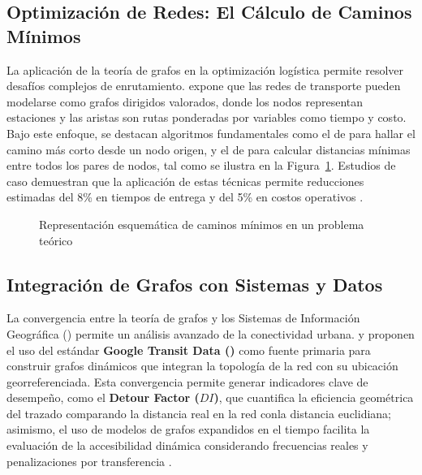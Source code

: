 \subsection{Optimización de Redes: El Cálculo de Caminos Mínimos}
\label{subsec:caminos-minimos}
    La aplicación de la teoría de grafos en la optimización logística permite resolver desafíos complejos de
    enrutamiento. \textcite{allauca2023} expone que las redes de transporte pueden modelarse como grafos dirigidos
    valorados, donde los nodos representan estaciones y las aristas son rutas ponderadas por variables como tiempo
    y costo. Bajo este enfoque, se destacan algoritmos fundamentales como el de \dijkstra{} para hallar el camino
    más corto desde un nodo origen, y el de \floyd{} para calcular distancias mínimas entre todos los pares de
    nodos, tal como se ilustra en la Figura~\ref{fig:CaminosMinimo}. Estudios de caso demuestran que la aplicación
    de estas técnicas permite reducciones estimadas del 8\% en tiempos de entrega y del 5\% en costos operativos
    \parencite{allauca2023}.

\begin{figure}[H]
    \centering
    \caption{Representación esquemática de caminos mínimos en un problema teórico}
    \label{fig:CaminosMinimo}
\end{figure}

\subsection{Integración de Grafos con Sistemas \gis{} y Datos \gtfs{}}
\label{subsec:grafos-sig-gtfs}
    La convergencia entre la teoría de grafos y los Sistemas de Información Geográfica (\gis{}) permite un
    análisis avanzado de la conectividad urbana. \textcite{fortin2016innovative} y \textcite{adas2013} proponen
    el uso del estándar \textbf{Google Transit Data (\gtfs{})} como fuente primaria para construir grafos
    dinámicos que integran la topología de la red con su ubicación georreferenciada. Esta convergencia permite
    generar indicadores clave de desempeño, como el \textbf{Detour Factor ($DI$)}, que cuantifica la eficiencia
    geométrica del trazado comparando la distancia real en la red con\DIFdelbegin {}\DIFdelend  la distancia euclidiana; asimismo, el
    uso de modelos de grafos expandidos en el tiempo facilita la evaluación de la accesibilidad dinámica
    considerando frecuencias reales y penalizaciones por transferencia \parencite{fortin2016innovative, adas2013}.

